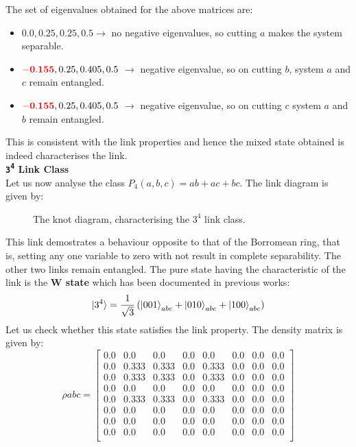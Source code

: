 \documentclass{scrartcl}
\begin{document}
            The set of eigenvalues obtained for the above matrices are:
            \begin{itemize}
                \item $0.0, 0.25, 0.25, 0.5 \longrightarrow$ no negative eigenvalues, so cutting $a$ makes the system separable.        
                \item $\mathbf{\mathcolor{red}{-0.155}}, 0.25, 0.405, 0.5$ $\longrightarrow$ negative eigenvalue, so on cutting $b$, system $a$ and $c$ remain entangled.
                \item $\mathbf{\mathcolor{red}{-0.155}}, 0.25, 0.405, 0.5$ $\longrightarrow$ negative eigenvalue, so on cutting $c$  system $a$ and $b$ remain entangled.
            \end{itemize}
            This is consistent with the link properties and hence the mixed state obtained is indeed characterises the link. \\[0.3cm]
\textbf{\large \texttt{3\textsuperscript{4}} Link Class} \\[0.3cm]
Let us now analyse the class $P_4(a,b,c) = ab+ac+bc$. The link diagram is given by:
\begin{figure}[H]
    \centering
    
  \caption{The knot diagram, characterising the $3^4$ link class.}
\end{figure}
\noindent
This link demostrates a behaviour opposite to that of the Borromean ring, that is, setting any one variable to zero with not result in complete separability. The other two links remain entangled. The pure state having the characteristic of the link is the \textbf{W state} which has been documented in previous works:
$$\ket{3^4} = \frac{1}{\sqrt{3}}\left( \ket{001}_{abc}+\ket{010}_{abc}+\ket{100}_{abc} \right)$$ 
Let us check whether this state satisfies the link property. The density matrix is given by:
\begin{equation*}
    \rho{abc}=
    \left[
    \begin{array}{cccccccc}
    0.0 & 0.0 & 0.0 & 0.0 & 0.0 & 0.0 & 0.0 & 0.0 \\
    0.0 & 0.333 & 0.333 & 0.0 & 0.333 & 0.0 & 0.0 & 0.0 \\
    0.0 & 0.333 & 0.333 & 0.0 & 0.333 & 0.0 & 0.0 & 0.0 \\
    0.0 & 0.0 & 0.0 & 0.0 & 0.0 & 0.0 & 0.0 & 0.0 \\
    0.0 & 0.333 & 0.333 & 0.0 & 0.333 & 0.0 & 0.0 & 0.0 \\
    0.0 & 0.0 & 0.0 & 0.0 & 0.0 & 0.0 & 0.0 & 0.0 \\
    0.0 & 0.0 & 0.0 & 0.0 & 0.0 & 0.0 & 0.0 & 0.0 \\
    0.0 & 0.0 & 0.0 & 0.0 & 0.0 & 0.0 & 0.0 & 0.0 \\
    \end{array}
    \right]
    \end{equation*}
\end{document}
